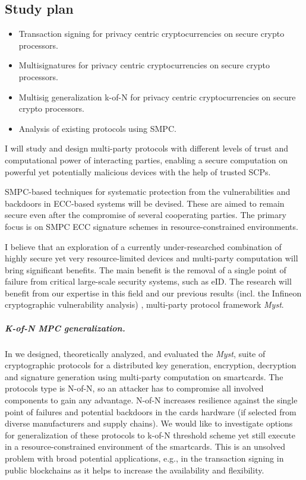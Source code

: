 \documentclass[
  digital, %
  twoside, %
  table,   %
  lof,     %
  lot,     %
]{fithesis3}
\theoremstyle{definition}
\theoremstyle{remark}
\begin{document}
\begin{ecmmnt}  %
\chapter{Study plan}
\begin{itemize}
	\item Transaction signing for privacy centric cryptocurrencies on secure crypto processors.  
    \item Multisignatures for privacy centric cryptocurrencies on secure crypto processors. 
    \item Multisig generalization k-of-N for privacy centric cryptocurrencies on secure crypto processors. 
    \item Analysis of existing protocols using SMPC. 
\end{itemize}

I will study and design multi-party protocols with different levels of trust and computational power of interacting parties, enabling a secure computation on powerful yet potentially malicious devices with the help of trusted SCPs.

SMPC-based techniques for systematic protection from the vulnerabilities and backdoors in ECC-based systems will be devised. These are aimed to remain secure even after the compromise of several cooperating parties. The primary focus is on SMPC ECC signature schemes in resource-constrained environments.

I believe that an exploration of a currently under-researched combination of highly secure yet very resource-limited devices and multi-party computation will bring significant benefits. The main benefit is the removal of a single point of failure from critical large-scale security systems, such as eID. The research will benefit from our expertise in this field and our previous results (incl. the Infineon cryptographic vulnerability analysis) \cite{2017-ccs-mavroudis, 2017-ccs-nemec}, multi-party protocol framework \emph{Myst}.

\paragraph{K-of-N MPC generalization.} In \cite{2017-ccs-mavroudis} we designed, theoretically analyzed, and evaluated the \emph{Myst}, suite of cryptographic protocols for a distributed key generation, encryption, decryption and signature generation using multi-party computation on smartcards. The protocols type is N-of-N, so an attacker has to compromise all involved components to gain any advantage. N-of-N increases resilience against the single point of failures and potential backdoors in the cards hardware (if selected from diverse manufacturers and supply chains). We would like to investigate options for generalization of these protocols to k-of-N threshold scheme yet still execute in a resource-constrained environment of the smartcards. This is an unsolved problem with broad potential applications, e.g., in the transaction signing in public blockchains as it helps to increase the availability and flexibility.  



\end{ecmmnt}
\end{document}

